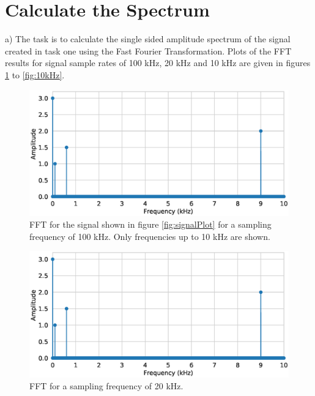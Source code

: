 \documentclass{scrartcl}			%
\begin{document}
\newpage

\section{Calculate the Spectrum}
a) The task is to calculate the single sided amplitude spectrum of the signal created in task one using the Fast Fourier Transformation. Plots of the FFT results for signal sample rates of 100 kHz, 20 kHz and 10 kHz are given in figures \ref{fig:100kHz} to \ref{fig:10kHz}. 

\begin{figure}[h!]					%
	\centering
	\includegraphics[width=\textwidth]{imgs/100kHz_samplefreq.eps}
	\captionsetup{width=\textwidth}  %
	\caption{FFT for the signal shown in figure \ref{fig:signalPlot} for a sampling frequency of 100 kHz. Only frequencies up to 10 kHz are shown.}
	\label{fig:100kHz} %
\end{figure}

\begin{figure}[h!]					%
	\centering
	\includegraphics[width=\textwidth]{imgs/20kHz_samplefreq.eps}
	\captionsetup{width=\textwidth}  %
	\caption{FFT for a sampling frequency of 20 kHz.}
	\label{fig:20kHz} %
\end{figure}
\end{document}
